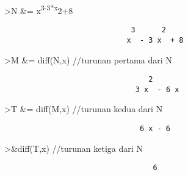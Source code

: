 \documentclass[
]{book}
\begin{document}
\textgreater N \&= x\textsuperscript{3-3*x}2+8

\begin{verbatim}
                             3      2
                            x  - 3 x  + 8
\end{verbatim}

\textgreater M \&= diff(N,x) //turunan pertama dari N

\begin{verbatim}
                                 2
                              3 x  - 6 x
\end{verbatim}

\textgreater T \&= diff(M,x) //turunan kedua dari N

\begin{verbatim}
                               6 x - 6
\end{verbatim}

\textgreater\&diff(T,x) //turunan ketiga dari N

\begin{verbatim}
                                  6
\end{verbatim}

\backmatter
\end{document}
